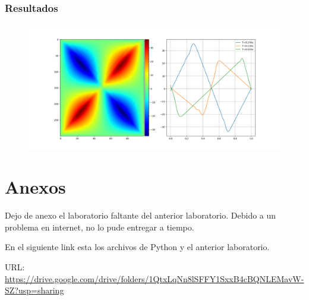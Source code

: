 \documentclass[a4paper,12pt]{article}
\begin{document}
    \subsubsection{Resultados}
    \begin{figure}[h]
        \centering
        \includegraphics[width=\textwidth]{graph4.png}
    \end{figure}
    \section{Anexos}
    Dejo de anexo el laboratorio faltante del anterior laboratorio.
    Debido a un problema en internet, no lo pude entregar a tiempo.
    
    En el siguiente link esta los archivos de Python y el anterior laboratorio.

    URL:\\ 
    \url{https://drive.google.com/drive/folders/1QtxLqNn8lSFFY1SxxB4cBQNLEMavW-SZ?usp=sharing}
\end{document}
